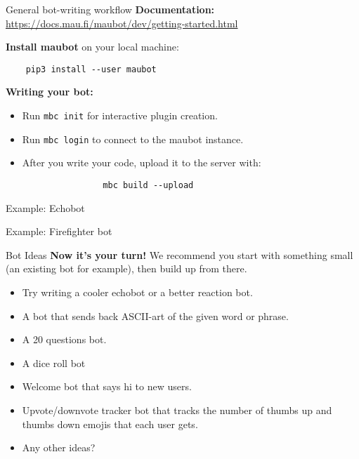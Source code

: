 \documentclass{acm}
\begin{document}
\begin{frame}[fragile]{General bot-writing workflow}
    \textbf{Documentation:}
    \url{https://docs.mau.fi/maubot/dev/getting-started.html}

    \bigskip

    \textbf{Install maubot} on your local machine:
    \begin{verbatim}
    pip3 install --user maubot
    \end{verbatim}

    \textbf{Writing your bot:}
    \begin{itemize}
        \item Run \texttt{mbc init} for interactive plugin creation.
        \item Run \texttt{mbc login} to connect to the maubot instance.
        \item After you write your code, upload it to the server with:
            \begin{verbatim}
                mbc build --upload
            \end{verbatim}
    \end{itemize}
\end{frame}

\begin{frame}[standout]
    \Huge
    Example: Echobot
\end{frame}

\begin{frame}[standout]
    \Huge
    Example: Firefighter bot
\end{frame}

\begin{frame}{Bot Ideas}
    \textbf{Now it's your turn!} We recommend you start with something small (an
    existing bot for example), then build up from there.

    \begin{itemize}
        \item Try writing a cooler echobot or a better reaction bot.
        \item A bot that sends back ASCII-art of the given word or phrase.
        \item A 20 questions bot.
        \item A dice roll bot
        \item Welcome bot that says hi to new users.
        \item Upvote/downvote tracker bot that tracks the number of thumbs up
            and thumbs down emojis that each user gets.
        \item Any other ideas?
    \end{itemize}
\end{frame}
\end{document}
